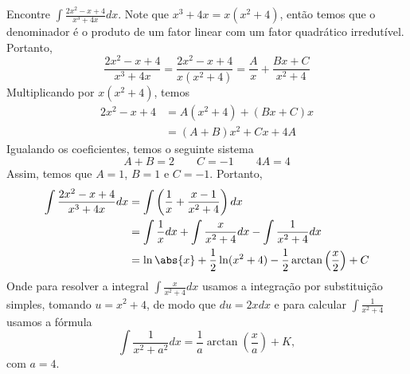 \begin{example}
  Encontre \(\int \frac{2x^2-x+4}{x^3+4x}dx\).
  \solution
  Note que $x^3+4x=x(x^2+4)$, então temos que o denominador é o produto de um
  fator linear com um fator quadrático irredutível. Portanto,
  \[
    \frac{2x^2-x+4}{x^3+4x}
    = \frac{2x^2-x+4}{x(x^2+4)}
    = \frac{A}{x}+ \frac{Bx+C}{x^2+4}
  \]
  Multiplicando por $x(x^2+4)$, temos
  \begin{align*}
    2x^2-x+4
    & = A(x^2+4)+(Bx+C)x \\
    & = (A+B)x^2+Cx+4A
  \end{align*}
  Igualando os coeficientes, temos o seguinte sistema
  \[
    A+B=2 \qquad C=-1 \qquad 4A=4
  \]
  Assim, temos que $A=1$, $B=1$ e $C=-1$. Portanto,
  \begin{align*}
    \int \frac{2x^2-x+4}{x^3+4x}dx
    & = \int \left( \frac{1}{x}+ \frac{x-1}{x^2+4} \right)dx \\
    & = \int \frac{1}{x}dx + \int \frac{x}{x^2+4} dx - \int \frac{1}{x^2+4} dx \\
    & = \ln\abs{x}
      + \frac{1}{2} \ln(x^2+4)
      - \frac{1}{2} \arctan\left(\frac{x}{2}\right)
      + C
  \end{align*}
  Onde para resolver a integral \(\int \frac{x}{x^2+4} dx\) usamos a integração
  por substituição simples, tomando $u=x^2+4$, de modo que $du=2xdx$ e para
  calcular \(\int \frac{1}{x^2+4}\) usamos a fórmula
  \[
    \int \frac{1}{x^2+a^2}dx
    = \frac{1}{a} \arctan\left(\frac{x}{a}\right)+K,
  \]
  com $a=4$.
\end{example}


